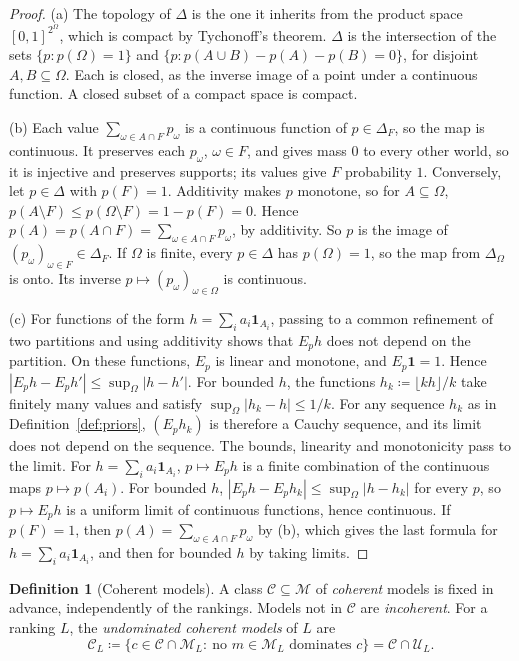 \documentclass[11pt]{article}
\theoremstyle{definition}
\newtheorem{definition}[theorem]{Definition}
\theoremstyle{remark}
\newcommand{\M}{\mathcal M}
\newcommand{\C}{\mathcal C}
\newcommand{\U}{\mathcal U}
\begin{document}
\begin{proof}
(a) The topology of $\Delta$ is the one it inherits from the product space $[0,1]^{2^\Omega}$, which is compact by Tychonoff's theorem. $\Delta$ is the intersection of the sets $\{p:p(\Omega)=1\}$ and $\{p:p(A\cup B)-p(A)-p(B)=0\}$, for disjoint $A,B\subseteq\Omega$. Each is closed, as the inverse image of a point under a continuous function. A closed subset of a compact space is compact.

(b) Each value $\sum_{\omega\in A\cap F}p_\omega$ is a continuous function of $p\in\Delta_F$, so the map is continuous. It preserves each $p_\omega$, $\omega\in F$, and gives mass $0$ to every other world, so it is injective and preserves supports; its values give $F$ probability $1$. Conversely, let $p\in\Delta$ with $p(F)=1$. Additivity makes $p$ monotone, so for $A\subseteq\Omega$, $p(A\setminus F)\le p(\Omega\setminus F)=1-p(F)=0$. Hence $p(A)=p(A\cap F)=\sum_{\omega\in A\cap F}p_\omega$, by additivity. So $p$ is the image of $(p_\omega)_{\omega\in F}\in\Delta_F$. If $\Omega$ is finite, every $p\in\Delta$ has $p(\Omega)=1$, so the map from $\Delta_\Omega$ is onto. Its inverse $p\mapsto(p_\omega)_{\omega\in\Omega}$ is continuous.

(c) For functions of the form $h=\sum_ia_i\mathbf 1_{A_i}$, passing to a common refinement of two partitions and using additivity shows that $E_ph$ does not depend on the partition. On these functions, $E_p$ is linear and monotone, and $E_p\mathbf 1=1$. Hence $|E_ph-E_ph'|\le\sup_\Omega|h-h'|$. For bounded $h$, the functions $h_k\coloneqq\lfloor kh\rfloor/k$ take finitely many values and satisfy $\sup_\Omega|h_k-h|\le1/k$. For any sequence $h_k$ as in Definition~\ref{def:priors}, $(E_ph_k)$ is therefore a Cauchy sequence, and its limit does not depend on the sequence. The bounds, linearity and monotonicity pass to the limit. For $h=\sum_ia_i\mathbf 1_{A_i}$, $p\mapsto E_ph$ is a finite combination of the continuous maps $p\mapsto p(A_i)$. For bounded $h$, $|E_ph-E_ph_k|\le\sup_\Omega|h-h_k|$ for every $p$, so $p\mapsto E_ph$ is a uniform limit of continuous functions, hence continuous. If $p(F)=1$, then $p(A)=\sum_{\omega\in A\cap F}p_\omega$ by (b), which gives the last formula for $h=\sum_ia_i\mathbf 1_{A_i}$, and then for bounded $h$ by taking limits.
\end{proof}


\begin{definition}[Coherent models]\label{def:coherence-property}
A class $\C\subseteq\M$ of \emph{coherent} models is fixed in advance, independently of the rankings. Models not in $\C$ are \emph{incoherent}. For a ranking $L$, the \emph{undominated coherent models} of $L$ are
\[
\C_L\coloneqq\{c\in\C\cap\M_L:\ \text{no } m\in\M_L \text{ dominates } c\}=\C\cap\U_L.
\]
\end{definition}
\end{document}
